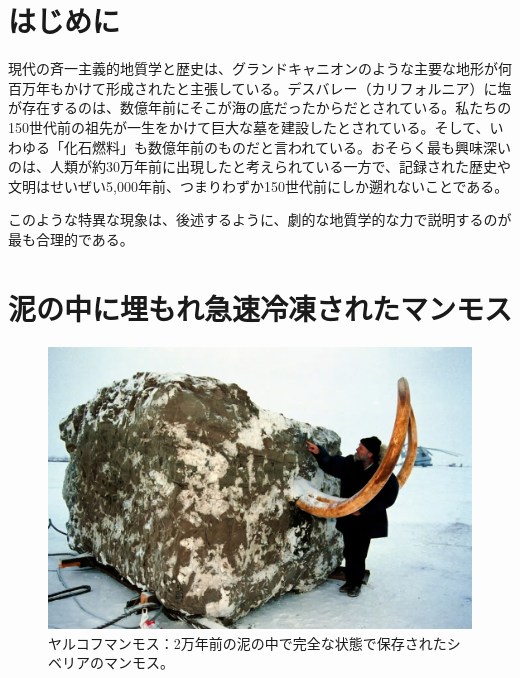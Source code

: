 \documentclass[10pt,twocolumn,letterpaper]{article}
\begin{document}
\section{はじめに}

現代の斉一主義的地質学と歴史は、グランドキャニオンのような主要な地形が何百万年もかけて形成されたと主張している\cite{143}。デスバレー（カリフォルニア）に塩が存在するのは、数億年前にそこが海の底だったからだとされている\cite{144}。私たちの150世代前の祖先が一生をかけて巨大な墓を建設したとされている\cite{29,70}。そして、いわゆる「化石燃料」も数億年前のものだと言われている\cite{104}。おそらく最も興味深いのは、人類が約30万年前に出現したと考えられている一方で、記録された歴史や文明はせいぜい5,000年前、つまりわずか150世代前にしか遡れないことである\cite{145}。

このような特異な現象は、後述するように、劇的な地質学的な力で説明するのが最も合理的である。

\section{泥の中に埋もれ急速冷凍されたマンモス}

\begin{figure}[t]
\begin{center}
   \includegraphics[width=1\linewidth]{jarkov-mammoth.jpg}
\end{center}
   \caption{ヤルコフマンモス：2万年前の泥の中で完全な状態で保存されたシベリアのマンモス\cite{51}。}
\label{fig:1}
\label{fig:onecol}
\end{figure}
\end{document}
